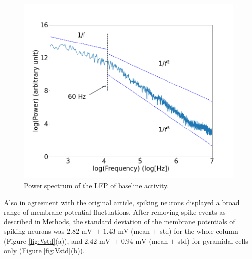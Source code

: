 \begin{figure}[H]
    \centering
    \includegraphics[scale=0.25]{LFP1.png}
    \caption{Power spectrum of the LFP of baseline activity.}
    \label{fig:LFP}
\end{figure}

Also in agreement with the original article, spiking neurons displayed a broad range of membrane potential fluctuations. After removing spike events as described in Methods, the standard deviation of the membrane potentials of spiking neurons was $2.82 \text{ mV } \pm 1.43 \text{ mV}$ (mean $\pm$ std) for the whole column (Figure \ref{fig:Vstd}(a)), and $2.42 \text { mV } \pm 0.94 \text{ mV}$ (mean $\pm$ std) for pyramidal cells only (Figure \ref{fig:Vstd}(b)).

